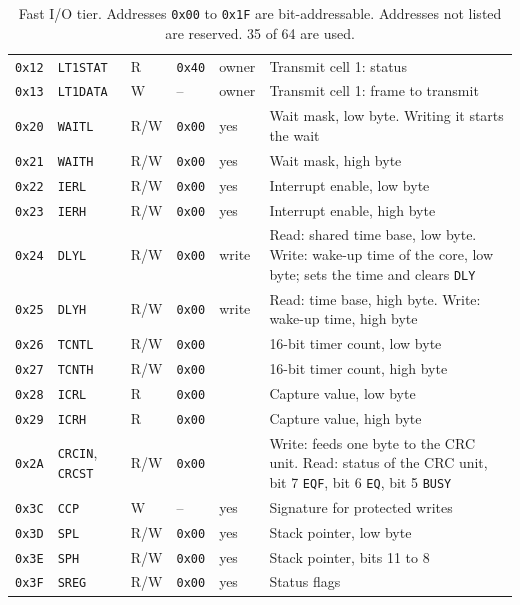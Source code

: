 \documentclass[10pt,a4paper]{article}
\newcommand{\reg}[1]{\texttt{#1}}
\begin{document}
\begin{table}[H]
\begin{tabularx}{\linewidth}{@{}lllllL@{}}
\texttt{0x12} & \reg{LT1STAT} & R & \texttt{0x40} & owner & Transmit cell 1: status \\
\texttt{0x13} & \reg{LT1DATA} & W & -- & owner & Transmit cell 1: frame to transmit \\
\texttt{0x20} & \reg{WAITL} & R/W & \texttt{0x00} & yes & Wait mask, low byte. Writing it starts the wait \\
\texttt{0x21} & \reg{WAITH} & R/W & \texttt{0x00} & yes & Wait mask, high byte \\
\texttt{0x22} & \reg{IERL} & R/W & \texttt{0x00} & yes & Interrupt enable, low byte \\
\texttt{0x23} & \reg{IERH} & R/W & \texttt{0x00} & yes & Interrupt enable, high byte \\
\texttt{0x24} & \reg{DLYL} & R/W & \texttt{0x00} & write & Read: shared time base, low byte. Write: wake-up time of the core, low byte; sets the time and clears \reg{DLY} \\
\texttt{0x25} & \reg{DLYH} & R/W & \texttt{0x00} & write & Read: time base, high byte. Write: wake-up time, high byte \\
\texttt{0x26} & \reg{TCNTL} & R/W & \texttt{0x00} & & 16-bit timer count, low byte \\
\texttt{0x27} & \reg{TCNTH} & R/W & \texttt{0x00} & & 16-bit timer count, high byte \\
\texttt{0x28} & \reg{ICRL} & R & \texttt{0x00} & & Capture value, low byte \\
\texttt{0x29} & \reg{ICRH} & R & \texttt{0x00} & & Capture value, high byte \\
\texttt{0x2A} & \reg{CRCIN}, \reg{CRCST} & R/W & \texttt{0x00} & & Write: feeds one byte to the CRC unit. Read: status of the CRC unit, bit 7 \reg{EQF}, bit 6 \reg{EQ}, bit 5 \reg{BUSY} \\
\midrule
\texttt{0x3C} & \reg{CCP} & W & -- & yes & Signature for protected writes \\
\texttt{0x3D} & \reg{SPL} & R/W & \texttt{0x00} & yes & Stack pointer, low byte \\
\texttt{0x3E} & \reg{SPH} & R/W & \texttt{0x00} & yes & Stack pointer, bits 11 to 8 \\
\texttt{0x3F} & \reg{SREG} & R/W & \texttt{0x00} & yes & Status flags \\
\bottomrule
\end{tabularx}
\caption{Fast I/O tier. Addresses \texttt{0x00} to \texttt{0x1F} are bit-addressable. Addresses not listed are reserved. 35 of 64 are used.}
\end{table}
\end{document}
